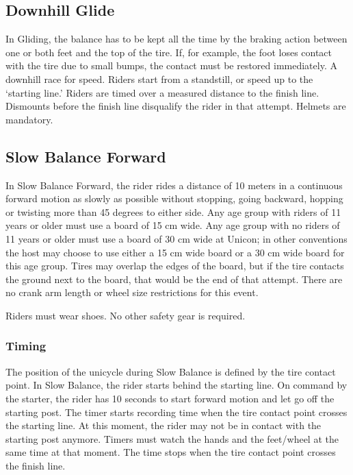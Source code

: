 \subsection{Downhill Glide}
In Gliding, the balance has to be kept all the time by the braking action between one or both feet and the top of the tire.
If, for example, the foot loses contact with the tire due to small bumps, the contact must be restored immediately.
A downhill race for speed.
Riders start from a standstill, or speed up to the `starting line.'
Riders are timed over a measured distance to the finish line.
Dismounts before the finish line disqualify the rider in that attempt.
Helmets are mandatory.

\subsection{Slow Balance Forward}

In Slow Balance Forward, the rider rides a distance of 10 meters in a continuous forward motion as slowly as possible without stopping, going backward, hopping or twisting more than 45 degrees to either side.
Any age group with riders of 11 years or older must use a board of 15 cm wide.
Any age group with no riders of 11 years or older must use a board of 30 cm wide at Unicon; in other conventions the host may choose to use either a 15 cm wide board or a 30 cm wide board for this age group.
Tires may overlap the edges of the board, but if the tire contacts the ground next to the board, that would be the end of that attempt.
There are no crank arm length or wheel size restrictions for this event.

Riders must wear shoes.
No other safety gear is required.

\subsubsection{Timing}
The position of the unicycle during Slow Balance is defined by the tire contact point.
In Slow Balance, the rider starts behind the starting line.
On command by the starter, the rider has 10 seconds to start forward motion and let go off the starting post.
The timer starts recording time when the tire contact point crosses the starting line.
At this moment, the rider may not be in contact with the starting post anymore.
Timers must watch the hands and the feet/wheel at the same time at that moment.
The time stops when the tire contact point crosses the finish line.

